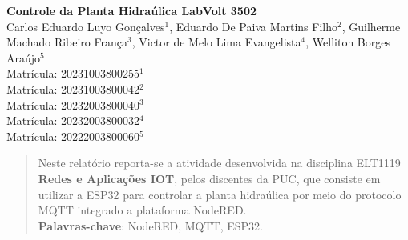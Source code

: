 \documentclass[a4paper,12pt]{article}
\begin{document}
\begin{center}
    \LARGE{\bf Controle da Planta Hidraúlica LabVolt 3502} \\
    \vspace{0.2cm}
    \large{
        Carlos Eduardo Luyo Gonçalves$^1$,
        Eduardo De Paiva Martins Filho$^2$,
        Guilherme Machado Ribeiro França$^3$,
        Victor de Melo Lima Evangelista$^4$,
        Welliton Borges Araújo$^5$
    } \\
    \vspace{0.25cm}
    \small{
        Matrícula: 20231003800255$^1$ \\
        Matrícula: 20231003800042$^2$ \\
        Matrícula: 20232003800040$^3$ \\
        Matrícula: 20232003800032$^4$ \\
        Matrícula: 20222003800060$^5$
    }
\end{center}

\hrulefill

\begin{abstract}
    Neste relatório reporta-se a atividade desenvolvida na disciplina ELT1119 \textbf{Redes e Aplicações IOT}, pelos discentes da PUC, que consiste em utilizar a ESP32 para controlar a planta hidraúlica por meio do protocolo MQTT integrado a plataforma NodeRED.  \\

    \textbf{Palavras-chave}: NodeRED, MQTT, ESP32.
\end{abstract}
\end{document}
